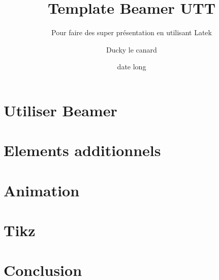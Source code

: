 \documentclass[A4,svgnames,9pt,aspectratio=169]{beamer}
\title[titrecourt]{Template Beamer UTT}
\subtitle{Pour faire des super présentation en utilisant Latek}
\date[00/00/202X]{date long}
\author[A. et al.]{Ducky le canard}
\begin{document}
\frame{\titlepage}

\renewcommand{\contentsname}{Sommaire}

\section{Utiliser Beamer}


\section{Elements additionnels}


\section{Animation}


\section{Tikz}



\section{Conclusion}



\appendix
\frame{\merci}




\end{document}
